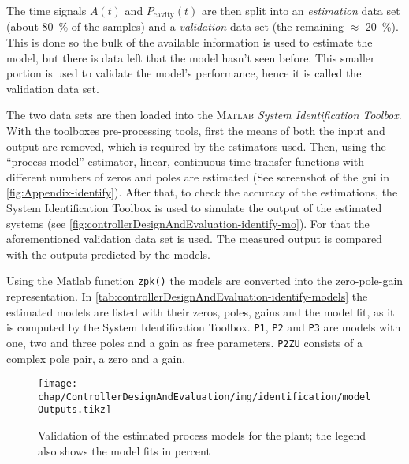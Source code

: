 The time signals $A(t)$ and $P_\text{cavity}(t)$ are then split into an \textit{estimation} data set (about \SI{80}{\percent} of the samples) and a \textit{validation} data set (the remaining $\approx$ \SI{20}{\percent}). This is done so the bulk of the available information is used to estimate the model, but there is data left that the model hasn't seen before. This smaller portion is used to validate the model's performance, hence it is called the validation data set.

The two data sets are then loaded into the \textsc{Matlab} \textit{System Identification Toolbox}. With the toolboxes pre-processing tools, first the means of both the input and output are removed, which is required by the estimators used.
Then, using the ``process model'' estimator, linear, continuous time transfer functions with different numbers of zeros and poles are estimated (See screenshot of the \gls{gui} in \autoref{fig:Appendix-identify}). After that, to check the accuracy of the estimations, the System Identification Toolbox is used to simulate the output of the estimated systems (see \autoref{fig:controllerDesignAndEvaluation-identify-mo}). For that the aforementioned validation data set is used. The measured output is compared with the outputs predicted by the models.

Using the Matlab function \texttt{zpk()} the models are converted into the zero-pole-gain representation. In
\autoref{tab:controllerDesignAndEvaluation-identify-models} the estimated models are listed with their zeros, poles, gains and the model fit, as it is computed by the System Identification Toolbox. \texttt{P1}, \texttt{P2} and \texttt{P3} are models with one, two and three poles and a gain as free parameters. \texttt{P2ZU} consists of a complex pole pair, a zero and a gain. 

\begin{figure}[tb]
	\centering
	\texttt{[image: chap/ControllerDesignAndEvaluation/img/identification/modelOutputs.tikz]}
	\caption[Validation of the process model]{Validation of the estimated process models for the plant; the legend also shows the model fits in percent}
	\label{fig:controllerDesignAndEvaluation-identify-mo}
\end{figure}

